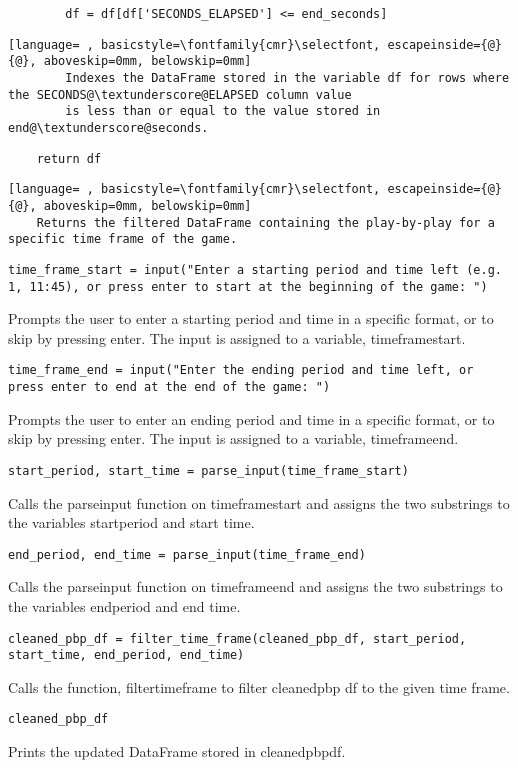 \documentclass{article}
\begin{document}
\begin{lstlisting}
        df = df[df['SECONDS_ELAPSED'] <= end_seconds]
\end{lstlisting}
\begin{lstlisting}[language= , basicstyle=\fontfamily{cmr}\selectfont, escapeinside={@}{@}, aboveskip=0mm, belowskip=0mm]
        Indexes the DataFrame stored in the variable df for rows where the SECONDS@\textunderscore@ELAPSED column value
        is less than or equal to the value stored in end@\textunderscore@seconds.
\end{lstlisting}
\begin{lstlisting}
    return df
\end{lstlisting}
\begin{lstlisting}[language= , basicstyle=\fontfamily{cmr}\selectfont, escapeinside={@}{@}, aboveskip=0mm, belowskip=0mm]
    Returns the filtered DataFrame containing the play-by-play for a specific time frame of the game.
\end{lstlisting}
\begin{lstlisting}
time_frame_start = input("Enter a starting period and time left (e.g. 1, 11:45), or press enter to start at the beginning of the game: ")
\end{lstlisting}
Prompts the user to enter a starting period and time in a specific format, or to skip by pressing enter. The input is assigned to a variable, time\textunderscore frame\textunderscore start.
\begin{lstlisting}
time_frame_end = input("Enter the ending period and time left, or press enter to end at the end of the game: ")
\end{lstlisting}
Prompts the user to enter an ending period and time in a specific format, or to skip by pressing enter. The input is assigned to a variable, time\textunderscore frame\textunderscore end.
\begin{lstlisting}
start_period, start_time = parse_input(time_frame_start)
\end{lstlisting}
Calls the parse\textunderscore input function on time\textunderscore frame\textunderscore start and assigns the two substrings to the variables start\textunderscore period and start \textunderscore time. 
\begin{lstlisting}
end_period, end_time = parse_input(time_frame_end)
\end{lstlisting}
Calls the parse\textunderscore input function on time\textunderscore frame\textunderscore end and assigns the two substrings to the variables end\textunderscore period and end \textunderscore time. 
\begin{lstlisting}
cleaned_pbp_df = filter_time_frame(cleaned_pbp_df, start_period, start_time, end_period, end_time)
\end{lstlisting}
Calls the function, filter\textunderscore time\textunderscore frame to filter cleaned\textunderscore pbp \textunderscore df to the given time frame.
\begin{lstlisting}
cleaned_pbp_df
\end{lstlisting}
Prints the updated DataFrame stored in cleaned\textunderscore pbp\textunderscore df.
\end{document}
